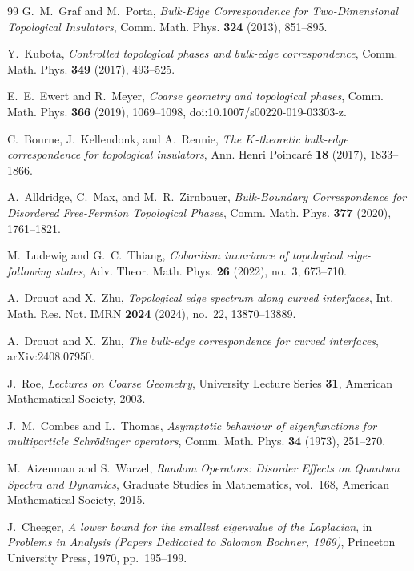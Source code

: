 \documentclass[11pt]{article}
\numberwithin{equation}{section}
\theoremstyle{definition}
\theoremstyle{remark}
\begin{document}
\begin{thebibliography}{99}
G.~M.~Graf and M.~Porta,
\emph{Bulk-Edge Correspondence for Two-Dimensional Topological Insulators},
Comm. Math. Phys. \textbf{324} (2013), 851--895.

Y.~Kubota,
\emph{Controlled topological phases and bulk-edge correspondence},
Comm. Math. Phys. \textbf{349} (2017), 493--525.

E.~E.~Ewert and R.~Meyer,
\emph{Coarse geometry and topological phases},
Comm. Math. Phys. \textbf{366} (2019), 1069--1098,
doi:10.1007/s00220-019-03303-z.

C.~Bourne, J.~Kellendonk, and A.~Rennie,
\emph{The $K$-theoretic bulk-edge correspondence for topological insulators},
Ann. Henri Poincar\'e \textbf{18} (2017), 1833--1866.

A.~Alldridge, C.~Max, and M.~R.~Zirnbauer,
\emph{Bulk-Boundary Correspondence for Disordered Free-Fermion Topological Phases},
Comm. Math. Phys. \textbf{377} (2020), 1761--1821.

M.~Ludewig and G.~C.~Thiang,
\emph{Cobordism invariance of topological edge-following states},
Adv. Theor. Math. Phys. \textbf{26} (2022), no.~3, 673--710.

A.~Drouot and X.~Zhu,
\emph{Topological edge spectrum along curved interfaces},
Int. Math. Res. Not. IMRN \textbf{2024} (2024), no.~22, 13870--13889.

A.~Drouot and X.~Zhu,
\emph{The bulk-edge correspondence for curved interfaces},
arXiv:2408.07950.

J.~Roe,
\emph{Lectures on Coarse Geometry},
University Lecture Series \textbf{31}, American Mathematical Society, 2003.

J.~M.~Combes and L.~Thomas,
\emph{Asymptotic behaviour of eigenfunctions for multiparticle Schr\"odinger operators},
Comm. Math. Phys. \textbf{34} (1973), 251--270.

M.~Aizenman and S.~Warzel,
\emph{Random Operators: Disorder Effects on Quantum Spectra and Dynamics},
Graduate Studies in Mathematics, vol.~168, American Mathematical Society, 2015.

J.~Cheeger,
\emph{A lower bound for the smallest eigenvalue of the Laplacian},
in \emph{Problems in Analysis (Papers Dedicated to Salomon Bochner, 1969)},
Princeton University Press, 1970, pp.~195--199.


\end{thebibliography}
\end{document}
